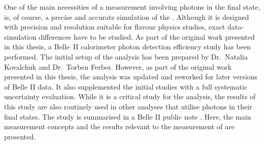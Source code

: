 One of the main necessities of a measurement involving photons in the final state, is, of course, a precise and accurate simulation of the \ECL.
Although it is designed with precision and resolution suitable for flavour physics studies, 
exact data-simulation differences have to be studied.
As part of the original work presented in this thesis, a Belle~II calorimeter photon detection efficiency study has been performed.
The initial setup of the analysis has been prepared by Dr.~Natalia Kovalchuk and Dr.~Torben Ferber. 
However, as part of the original work presented in this thesis, the analysis was updated and reworked for later versions of Belle II data. 
It also supplemented the initial studies with a full systematic uncertainty evaluation.
While it is a critical study for the \BtoXsgamma analysis, the results of this study are also routinely used in other analyses that utilise photons in their final states.
The study is summarised in a Belle II public note \cite{Henrikas:2604}.
Here, the main measurement concepts and the results relevant to the measurement of \BtoXsgamma are presented.

